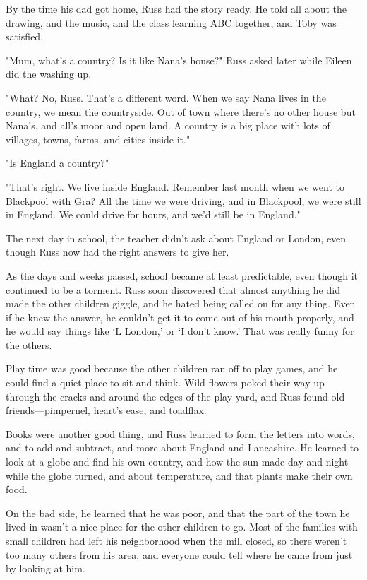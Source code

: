 By the time his dad got home, Russ had the story ready. He told all about the drawing, and the music, and the class learning ABC together, and Toby was satisfied.

"Mum, what's a country? Is it like Nana's house?" Russ asked later while Eileen did the washing up.

"What? No, Russ. That's a different word. When we say Nana lives in the country, we mean the countryside. Out of town where there's no other house but Nana's, and all's moor and open land. A country is a big place with lots of villages, towns, farms, and cities inside it."

"Is England a country?"

"That's right. We live inside England. Remember last month when we went to Blackpool with Gra? All the time we were driving, and in Blackpool, we were still in England. We could drive for hours, and we'd still be in England."

The next day in school, the teacher didn't ask about England or London, even though Russ now had the right answers to give her.

As the days and weeks passed, school became at least predictable, even though it continued to be a torment. Russ soon discovered that almost anything he did made the other children giggle, and he hated being called on for any thing. Even if he knew the answer, he couldn't get it to come out of his mouth properly, and he would say things like `L{\el} London,' or `I don't{\el} know.' That was really funny for the others.

Play time was good because the other children ran off to play games, and he could find a quiet place to sit and think. Wild flowers poked their way up through the cracks and around the edges of the play yard, and Russ found old friends—pimpernel, heart's ease, and toadflax.

Books were another good thing, and Russ learned to form the letters into words, and to add and subtract, and more about England and Lancashire. He learned to look at a globe and find his own country, and how the sun made day and night while the globe turned, and about temperature, and that plants make their own food.

On the bad side, he learned that he was poor, and that the part of the town he lived in wasn't a nice place for the other children to go. Most of the families with small children had left his neighborhood when the mill closed, so there weren't too many others from his area, and everyone could tell where he came from just by looking at him.

